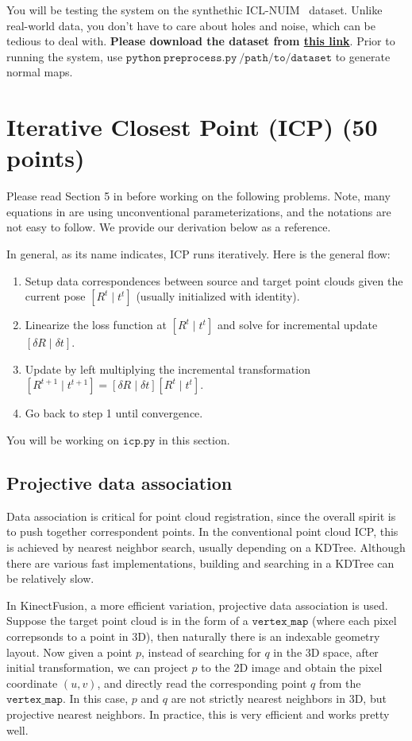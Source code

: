 \documentclass[12pt, a4paper]{article}
\begin{document}
You will be testing the system on the synthethic ICL-NUIM~\cite{icl_nuim} dataset. Unlike real-world data, you don't have to care about holes and noise, which can be tedious to deal with. \textbf{Please download the dataset from \href{http://www.doc.ic.ac.uk/~ahanda/living_room_traj2_frei_png.tar.gz}{this link}}. Prior to running the system, use $\mathtt{python~preprocess.py~/path/to/dataset}$ to generate normal maps.


\section{Iterative Closest Point (ICP) (50 points)}
Please read Section 5 in \cite{fusion} before working on the following problems. Note, many equations in \cite{fusion} are using unconventional parameterizations, and the notations are not easy to follow. We provide our derivation below as a reference.

In general, as its name indicates, ICP runs iteratively. Here is the general flow:
\begin{enumerate}
	\item Setup data correspondences between source and target point clouds given the current pose $[R^t \mid t^t]$ (usually initialized with identity).
	\item Linearize the loss function at $[R^t \mid t^t]$ and solve for incremental update $[\delta R \mid \delta t]$.
	\item Update by left multiplying the incremental transformation $[R^{t+1} \mid t^{t+1}] = [\delta R \mid \delta t] [R^t \mid t^t]$.
	\item Go back to step 1 until convergence.
\end{enumerate}
You will be working on $\mathtt{icp.py}$ in this section.

\subsection{Projective data association}
Data association is critical for point cloud registration, since the overall spirit is to push together correspondent points.
In the conventional point cloud ICP, this is achieved by nearest neighbor search, usually depending on a KDTree. Although there are various fast implementations, building and searching in a KDTree can be relatively slow.

In KinectFusion, a more efficient variation, projective data association is used. Suppose the target point cloud is in the form of a $\mathtt{vertex\_map}$ (where each pixel correpsonds to a point in 3D), then naturally there is an indexable geometry layout. Now given a point $p$, instead of searching for $q$ in the 3D space, after initial transformation, we can project $p$ to the 2D image and obtain the pixel coordinate $(u, v)$, and directly read the corresponding point $q$ from the $\mathtt{vertex\_map}$. In this case, $p$ and $q$ are not strictly nearest neighbors in 3D, but projective nearest neighbors. In practice, this is very efficient and works pretty well.
\end{document}
